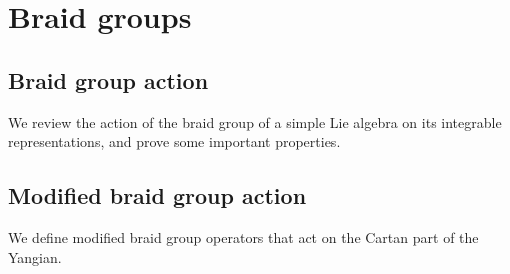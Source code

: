 \chapter{Braid groups}

\section{Braid group action}

We review the action of the braid group of a simple Lie algebra on its integrable representations, and prove some important properties.

\section{Modified braid group action}

We define modified braid group operators that act on the Cartan part of the Yangian.
